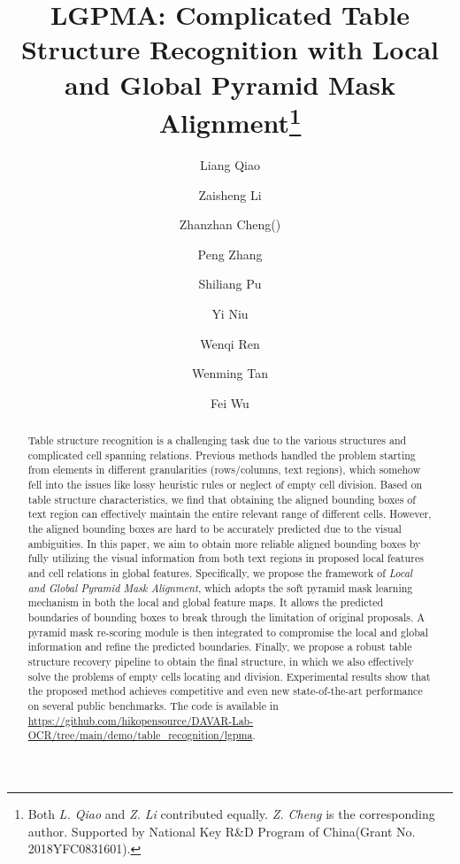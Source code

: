 \documentclass[runningheads]{llncs}
\begin{document}
\title{LGPMA: Complicated Table Structure Recognition with Local and Global Pyramid Mask Alignment\thanks{Both \emph{L. Qiao} and \emph{Z. Li} contributed equally.\emph{ Z. Cheng} is the corresponding author. Supported by National Key R\&D Program of China(Grant No. 2018YFC0831601).}}


\author{Liang Qiao\and Zaisheng Li\and Zhanzhan Cheng(\Letter)
         \and Peng Zhang
         \and Shiliang Pu\and Yi Niu
         \and Wenqi Ren
         \and Wenming Tan
         \and Fei Wu}

\maketitle              

\begin{abstract}
Table structure recognition is a challenging task due to the various structures and complicated cell spanning relations.
Previous methods handled the problem starting from elements in different granularities (rows/columns, text regions), which somehow fell into the issues like lossy heuristic rules or neglect of empty cell division.
Based on table structure characteristics, we find that obtaining the aligned bounding boxes of text region can effectively maintain the entire relevant range of different cells.
However, the aligned bounding boxes are hard to be accurately predicted due to the visual ambiguities.
In this paper, we aim to obtain more reliable aligned bounding boxes by fully utilizing the visual information from both text regions in proposed local features and cell relations in global features. Specifically, we propose the framework of \emph{Local and Global Pyramid Mask Alignment}, which adopts the soft pyramid mask learning mechanism in both the local and global feature maps. It allows the predicted boundaries of bounding boxes to break through the limitation of original proposals. A pyramid mask re-scoring module is then integrated to compromise the local and global information and refine the predicted boundaries.
Finally, we propose a robust table structure recovery pipeline to obtain the final structure, in which we also effectively solve the problems of empty cells locating and division. Experimental results show that the proposed method achieves competitive and even new state-of-the-art performance on several public benchmarks. The code is available in \url{https://github.com/hikopensource/DAVAR-Lab-OCR/tree/main/demo/table\_recognition/lgpma}.
\end{abstract}
\end{document}
